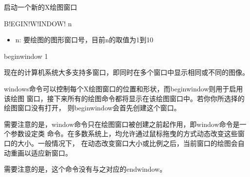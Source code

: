 \label{cmd:beginwindow}

启动一个新的X绘图窗口

B!EGIN!W!INDOW! n

\begin{itemize}
\item n: 要绘图的图形窗口号，目前n的取值为1到10
\end{itemize}

\begin{SACDFT}
beginwindow 1
\end{SACDFT}

现在的计算机系统大多支持多窗口，即同时在多个窗口中显示相同或不同的图像。

windows命令可以控制每个X绘图窗口的位置和形状，而beginwindow则用于启用该绘图
窗口，接下来所有的绘图命令都将显示在该绘图窗口中。若你你所选择的绘图窗口没有打开，
则beginwindow会首先创建这个窗口。

需要注意的是，window命令只在绘图窗口被创建之前起作用，即window命令是一个参数设定类
命令。在多数系统上，均允许通过鼠标拖曳的方式动态改变这些窗口的大小。一般情况下，
在动态改变窗口大小或比例之后，当前窗口的绘图会自动重画以适应新窗口。

需要注意的是，这个命令没有与之对应的endwindow。

